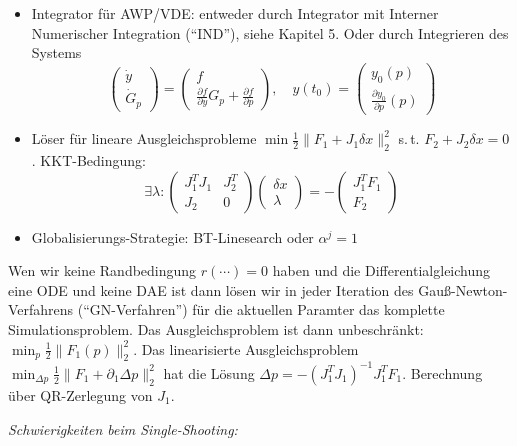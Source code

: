 \begin{itemize}
\item Integrator für AWP/VDE: entweder durch Integrator mit Interner Numerischer Integration ("`IND"'), siehe Kapitel 5. Oder durch Integrieren des Systems
\[\begin{pmatrix} \dot y \\ \dot G_p \end{pmatrix} = \begin{pmatrix} f \\ \frac{\partial f}{\partial y} G_p + \frac{\partial f}{\partial p}\end{pmatrix}, \quad y(t_0) = \begin{pmatrix} y_0(p) \\ \frac{\partial y_0}{\partial p}(p) \end{pmatrix} \]
\item Löser für lineare Ausgleichsprobleme $\min \tfrac 12 \|F_1 + J_1 \delta x\|_2^2$ s.\,t. $F_2 + J_2 \delta x = 0$. KKT-Bedingung:
\[ \exists \lambda\colon \begin{pmatrix} J_1^T J_1 & J_2^T \\ J_2 & 0 \end{pmatrix} \begin{pmatrix} \delta x \\ \lambda \end{pmatrix} = -\begin{pmatrix} J_1^T F_1 \\ F_2 \end{pmatrix} \]
\item Globalisierungs-Strategie: BT-Linesearch oder $\alpha^j = 1$
\end{itemize}










Wen wir keine Randbedingung $r(\cdots)=0$ haben und die Differentialgleichung eine ODE und keine DAE ist dann lösen wir in jeder Iteration des Gauß-Newton-Verfahrens ("`GN-Verfahren"') für die aktuellen Paramter das komplette Simulationsproblem. Das Ausgleichsproblem ist dann unbeschränkt: $\min_p \tfrac 12 \|F_1(p)\|_2^2$. Das linearisierte Ausgleichsproblem $\min_{\Delta p} \tfrac 12 \|F_1 + \partial_1 \Delta p\|_2^2$ hat die Lösung $\Delta p = -(J_1^T J_1)^{-1} J_1^T F_1$. Berechnung über QR-Zerlegung von $J_1$.

\emph{Schwierigkeiten beim Single-Shooting:}

